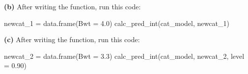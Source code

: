\documentclass[
]{article}
\newenvironment{Shaded}{\begin{snugshade}}{\end{snugshade}}
\newcommand{\AttributeTok}[1]{\textcolor[rgb]{0.77,0.63,0.00}{#1}}
\newcommand{\FloatTok}[1]{\textcolor[rgb]{0.00,0.00,0.81}{#1}}
\newcommand{\FunctionTok}[1]{\textcolor[rgb]{0.00,0.00,0.00}{#1}}
\newcommand{\NormalTok}[1]{#1}
\newcommand{\OtherTok}[1]{\textcolor[rgb]{0.56,0.35,0.01}{#1}}
\begin{document}
\textbf{(b)} After writing the function, run this code:

\begin{Shaded}
\begin{Highlighting}[]
\NormalTok{newcat\_1 }\OtherTok{=} \FunctionTok{data.frame}\NormalTok{(}\AttributeTok{Bwt =} \FloatTok{4.0}\NormalTok{)}
\FunctionTok{calc\_pred\_int}\NormalTok{(cat\_model, newcat\_1)}
\end{Highlighting}
\end{Shaded}

\textbf{(c)} After writing the function, run this code:

\begin{Shaded}
\begin{Highlighting}[]
\NormalTok{newcat\_2 }\OtherTok{=} \FunctionTok{data.frame}\NormalTok{(}\AttributeTok{Bwt =} \FloatTok{3.3}\NormalTok{)}
\FunctionTok{calc\_pred\_int}\NormalTok{(cat\_model, newcat\_2, }\AttributeTok{level =} \FloatTok{0.90}\NormalTok{)}
\end{Highlighting}
\end{Shaded}
\end{document}
